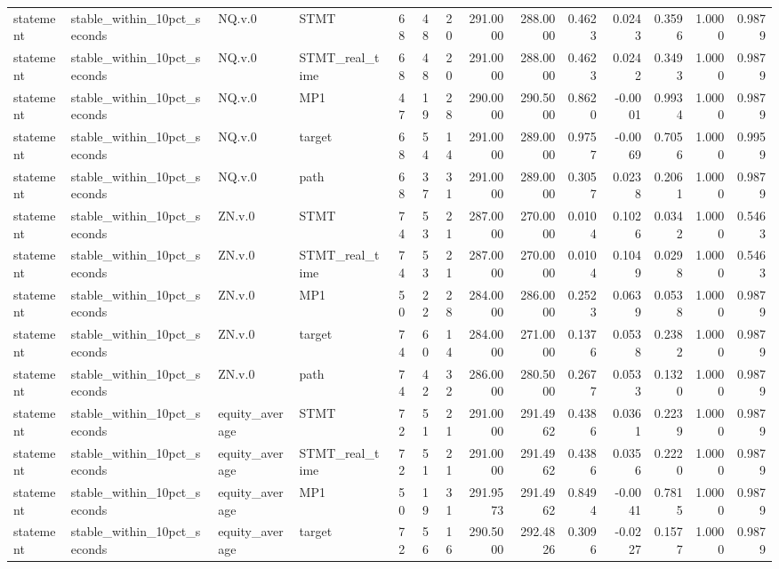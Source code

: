 \begin{tabular}{llllrrrrrrrrrr}
statement & stable_within_10pct_seconds & NQ.v.0 & STMT & 68 & 48 & 20 & 291.0000 & 288.0000 & 0.4623 & 0.0243 & 0.3596 & 1.0000 & 0.9879 \\
statement & stable_within_10pct_seconds & NQ.v.0 & STMT_real_time & 68 & 48 & 20 & 291.0000 & 288.0000 & 0.4623 & 0.0242 & 0.3493 & 1.0000 & 0.9879 \\
statement & stable_within_10pct_seconds & NQ.v.0 & MP1 & 47 & 19 & 28 & 290.0000 & 290.5000 & 0.8620 & -0.0001 & 0.9934 & 1.0000 & 0.9879 \\
statement & stable_within_10pct_seconds & NQ.v.0 & target & 68 & 54 & 14 & 291.0000 & 289.0000 & 0.9757 & -0.0069 & 0.7056 & 1.0000 & 0.9959 \\
statement & stable_within_10pct_seconds & NQ.v.0 & path & 68 & 37 & 31 & 291.0000 & 289.0000 & 0.3057 & 0.0238 & 0.2061 & 1.0000 & 0.9879 \\
statement & stable_within_10pct_seconds & ZN.v.0 & STMT & 74 & 53 & 21 & 287.0000 & 270.0000 & 0.0104 & 0.1026 & 0.0342 & 1.0000 & 0.5463 \\
statement & stable_within_10pct_seconds & ZN.v.0 & STMT_real_time & 74 & 53 & 21 & 287.0000 & 270.0000 & 0.0104 & 0.1049 & 0.0298 & 1.0000 & 0.5463 \\
statement & stable_within_10pct_seconds & ZN.v.0 & MP1 & 50 & 22 & 28 & 284.0000 & 286.0000 & 0.2523 & 0.0639 & 0.0538 & 1.0000 & 0.9879 \\
statement & stable_within_10pct_seconds & ZN.v.0 & target & 74 & 60 & 14 & 284.0000 & 271.0000 & 0.1376 & 0.0538 & 0.2382 & 1.0000 & 0.9879 \\
statement & stable_within_10pct_seconds & ZN.v.0 & path & 74 & 42 & 32 & 286.0000 & 280.5000 & 0.2677 & 0.0533 & 0.1320 & 1.0000 & 0.9879 \\
statement & stable_within_10pct_seconds & equity_average & STMT & 72 & 51 & 21 & 291.0000 & 291.4962 & 0.4386 & 0.0361 & 0.2239 & 1.0000 & 0.9879 \\
statement & stable_within_10pct_seconds & equity_average & STMT_real_time & 72 & 51 & 21 & 291.0000 & 291.4962 & 0.4386 & 0.0356 & 0.2220 & 1.0000 & 0.9879 \\
statement & stable_within_10pct_seconds & equity_average & MP1 & 50 & 19 & 31 & 291.9573 & 291.4962 & 0.8494 & -0.0041 & 0.7815 & 1.0000 & 0.9879 \\
statement & stable_within_10pct_seconds & equity_average & target & 72 & 56 & 16 & 290.5000 & 292.4826 & 0.3096 & -0.0227 & 0.1577 & 1.0000 & 0.9879 \\

\end{tabular}

